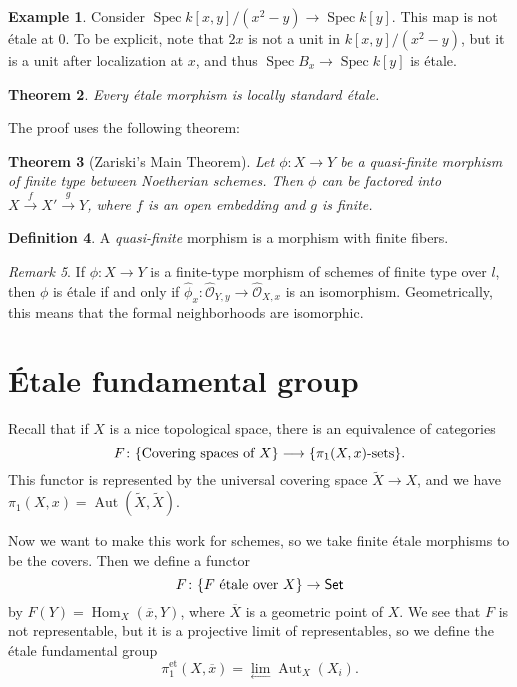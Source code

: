 \documentclass[leqno, openany]{memoir}
\newtheorem{thm}{Theorem}[section]
\theoremstyle{definition}
\newtheorem{defn}[thm]{Definition}
\newtheorem{exm}[thm]{Example}
\theoremstyle{remark}
\newtheorem{rmk}[thm]{Remark}
\theoremstyle{plain}
\theoremstyle{definition}
\theoremstyle{remark}
\newcommand{\mc}[1]{\mathcal{#1}}
\newcommand{\mr}[1]{\mathrm{#1}}
\newcommand{\ms}[1]{\mathsf{#1}}
\newcommand{\ol}[1]{\overline{#1}}
\newcommand{\wt}[1]{\widetilde{#1}}
\newcommand{\wh}[1]{\widehat{#1}}
\DeclareMathOperator{\Hom}{Hom}
\DeclareMathOperator{\Aut}{Aut}
\DeclareMathOperator{\Spec}{Spec}
\begin{document}
\begin{exm} Consider $\Spec k[x,y]/(x^2-y) \to \Spec k[y]$. This map is not
    \'etale at $0$. To be explicit, note that $2x$ is not a unit in
    $k[x,y]/(x^2-y)$, but it is a unit after localization at $x$, and thus
    $\Spec B_x \to \Spec k[y]$ is \'etale.  \end{exm}

\begin{thm} Every \'etale morphism is locally standard \'etale.  \end{thm}

The proof uses the following theorem:

\begin{thm}[Zariski's Main Theorem] Let $\phi \colon X \to Y$ be a quasi-finite
    morphism of finite type between Noetherian schemes. Then $\phi$ can be
    factored into $X \xrightarrow{f} X' \xrightarrow{g} Y$, where $f$ is an
    open embedding and $g$ is finite.  \end{thm}

\begin{defn} A \textit{quasi-finite} morphism is a morphism with finite fibers.
\end{defn}

\begin{rmk} If $\phi \colon X \to Y$ is a finite-type morphism of schemes of
    finite type over $l$, then $\phi$ is \'etale if and only if $\wh{\phi}_x
    \colon \wh{\mc{O}}_{Y,y} \to \wh{\mc{O}}_{X,x}$ is an isomorphism.
    Geometrically, this means that the formal neighborhoods are isomorphic.
\end{rmk}

\section{\'Etale fundamental group}%

Recall that if $X$ is a nice topological space, there is an equivalence of
categories \[ F \colon \qty{ \text{Covering spaces of $X$} } \longrightarrow
\qty{ \pi_1(X,x)\text{-sets} }. \] This functor is represented by the universal
covering space $\wt{X} \to X$, and we have $\pi_1(X,x) = \Aut (\wt{X},
\wt{X})$.

Now we want to make this work for schemes, so we take finite \'etale morphisms
to be the covers. Then we define a functor \[ F \colon \qty{F \text{ \'etale
over }X} \to \ms{Set} \] by $F(Y) = \Hom_X(\ol{x}, Y)$, where $\ol{X}$ is a
geometric point of $X$. We see that $F$ is not representable, but it is a
projective limit of representables, so we define the \'etale fundamental group
\[ \pi_1^{\mr{et}}(X,\ol{x}) = \lim_{\gets} \Aut_X(X_i). \]
\end{document}
